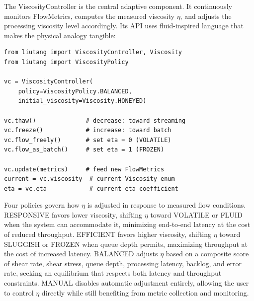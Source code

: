 \documentclass[conference]{IEEEtran}
\begin{document}
The ViscosityController is the central adaptive component. It continuously monitors FlowMetrics, computes the measured viscosity $\eta$, and adjusts the processing viscosity level accordingly. Its API uses fluid-inspired language that makes the physical analogy tangible:

\begin{lstlisting}
from liutang import ViscosityController, Viscosity
from liutang import ViscosityPolicy

vc = ViscosityController(
    policy=ViscosityPolicy.BALANCED,
    initial_viscosity=Viscosity.HONEYED)

vc.thaw()              # decrease: toward streaming
vc.freeze()            # increase: toward batch
vc.flow_freely()       # set eta = 0 (VOLATILE)
vc.flow_as_batch()     # set eta = 1 (FROZEN)

vc.update(metrics)     # feed new FlowMetrics
current = vc.viscosity  # current Viscosity enum
eta = vc.eta            # current eta coefficient
\end{lstlisting}

Four policies govern how $\eta$ is adjusted in response to measured flow conditions. RESPONSIVE favors lower viscosity, shifting $\eta$ toward VOLATILE or FLUID when the system can accommodate it, minimizing end-to-end latency at the cost of reduced throughput. EFFICIENT favors higher viscosity, shifting $\eta$ toward SLUGGISH or FROZEN when queue depth permits, maximizing throughput at the cost of increased latency. BALANCED adjusts $\eta$ based on a composite score of shear rate, shear stress, queue depth, processing latency, backlog, and error rate, seeking an equilibrium that respects both latency and throughput constraints. MANUAL disables automatic adjustment entirely, allowing the user to control $\eta$ directly while still benefiting from metric collection and monitoring.
\end{document}
